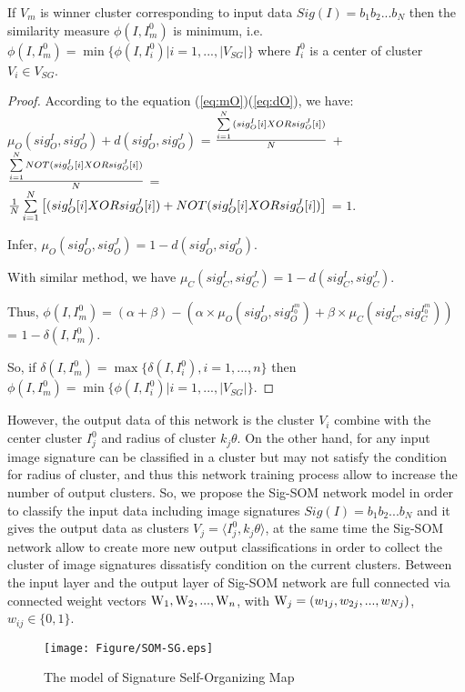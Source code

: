 \documentclass{amcs}
\begin{document}
\begin{theorem}{}
If ${V_m}$ is winner cluster corresponding to input data $Sig(I) = {b_1}{b_2}...{b_N}$ then the similarity measure $\phi (I,I_m^0)$ is minimum, i.e. $\phi (I,I_m^0) = \min \{ \phi (I,I_i^0)|i = 1,...,|{V_{SG}}|\} $ where $I_i^0$ is a center of cluster ${V_i} \in {V_{SG}}$.
\end{theorem}
\begin{proof}{}

According to the equation (\ref{eq:mO})(\ref{eq:dO}), we have: ${\mu _O}(sig_O^I,sig_O^J) + d(sig_O^I,sig_O^J)$ = $\frac{{\sum\limits_{i = 1}^N {(sig_O^I[i]{\rm{ }}XOR{\rm{ }}sig_O^J[i])} }}{N}$ + $\frac{{\sum\limits_{i = 1}^N {NOT(sig_O^I[i]{\rm{ }}XOR{\rm{ }}sig_O^J[i])} }}{N}$ = $\frac{1}{N}\sum\limits_{i = 1}^N {\left[ {(sig_O^I[i]{\rm{ }}XOR{\rm{ }}sig_O^J[i]) + NOT(sig_O^I[i]{\rm{ }}XOR{\rm{ }}sig_O^J[i])} \right]} $ = $1$.

Infer, ${\mu _O}(sig_O^I,sig_O^J) = 1 - d(sig_O^I,sig_O^J)$.

With similar method, we have ${\mu _C}(sig_C^I,sig_C^J) = 1 - d(sig_C^I,sig_C^J)$.

Thus, $\phi (I,I_m^0) = (\alpha  + \beta ) - (\alpha  \times {\mu _O}(sig_O^I,sig_O^{I_0^m}) + \beta  \times {\mu _C}(sig_C^I,sig_C^{I_0^m}))$ = $1 - \delta (I,I_m^0)$.

So, if $\delta (I,I_m^0) = \max \{ \delta (I,I_i^0),i = 1,...,n\} $ then $\phi (I,I_m^0) = \min \{ \phi (I,I_i^0)|i = 1,...,|{V_{SG}}|\} $.
\end{proof}

However, the output data of this network is the cluster ${V_i}$ combine with the center cluster ${I_j^0}$ and radius of cluster ${k_j}\theta $. On the other hand, for any input image signature can be classified in a cluster but may not satisfy the condition for radius of cluster, and thus this network training process allow to increase the number of output clusters. So, we propose the Sig-SOM network model in order to classify the input data including image signatures $Sig(I) = {b_1}{b_2}...{b_N}$ and it gives the output data as clusters ${V_j} = \langle {I_j^0},{k_j}\theta \rangle $, at the same time the Sig-SOM network allow to create more new output classifications in order to collect the cluster of image signatures dissatisfy condition on the current clusters. Between the input layer and the output layer of Sig-SOM network are full connected  via connected weight vectors ${{\rm{W}}_1},{{\rm{W}}_2},...,{{\rm{W}}_n}$, with ${{\rm{W}}_j} = ({w_{1j}},{w_{2j}},...,{w_{Nj}})$, ${w_{ij}} \in \{ 0,1\} $.
\begin{figure}[!ht]
	\centering
		\texttt{[image: Figure/SOM-SG.eps]}
		\caption{The model of Signature Self-Organizing Map}
		\label{fig:Sig-SOM}
\end{figure}
\end{document}
